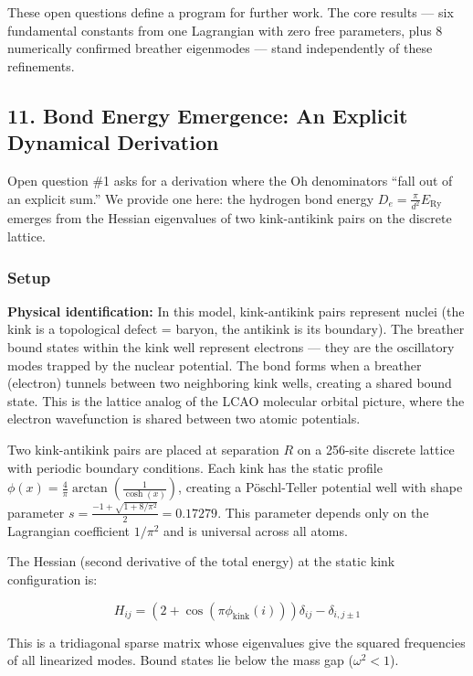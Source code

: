 \documentclass[
]{article}
\begin{document}
These open questions define a program for further work. The core results
--- six fundamental constants from one Lagrangian with zero free
parameters, plus 8 numerically confirmed breather eigenmodes --- stand
independently of these refinements.

\subsection{11. Bond Energy Emergence: An Explicit Dynamical
Derivation}\label{bond-energy-emergence-an-explicit-dynamical-derivation}

Open question \#1 asks for a derivation where the Oh denominators ``fall
out of an explicit sum.'' We provide one here: the hydrogen bond energy
\(D_e = \frac{\pi}{d^2} E_{\text{Ry}}\) emerges from the Hessian
eigenvalues of two kink-antikink pairs on the discrete lattice.

\subsubsection{Setup}\label{setup}

\textbf{Physical identification:} In this model, kink-antikink pairs
represent nuclei (the kink is a topological defect = baryon, the
antikink is its boundary). The breather bound states within the kink
well represent electrons --- they are the oscillatory modes trapped by
the nuclear potential. The bond forms when a breather (electron) tunnels
between two neighboring kink wells, creating a shared bound state. This
is the lattice analog of the LCAO molecular orbital picture, where the
electron wavefunction is shared between two atomic potentials.

Two kink-antikink pairs are placed at separation \(R\) on a 256-site
discrete lattice with periodic boundary conditions. Each kink has the
static profile
\(\phi(x) = \frac{4}{\pi}\arctan\left(\frac{1}{\cosh(x)}\right)\),
creating a Pöschl-Teller potential well with shape parameter
\(s = \frac{-1+\sqrt{1+8/\pi^2}}{2} = 0.17279\). This parameter depends
only on the Lagrangian coefficient \(1/\pi^2\) and is universal across
all atoms.

The Hessian (second derivative of the total energy) at the static kink
configuration is:

\[H_{ij} = \left(2 + \cos(\pi\phi_\text{kink}(i))\right)\delta_{ij} - \delta_{i,j\pm 1}\]

This is a tridiagonal sparse matrix whose eigenvalues give the squared
frequencies of all linearized modes. Bound states lie below the mass gap
(\(\omega^2 < 1\)).
\end{document}
